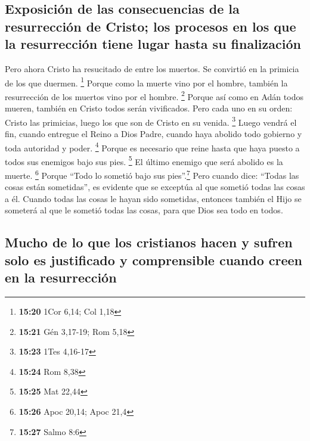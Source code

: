 \begin{paracol}{2}
\hypertarget{exposiciuxf3n-de-las-consecuencias-de-la-resurrecciuxf3n-de-cristo-los-procesos-en-los-que-la-resurrecciuxf3n-tiene-lugar-hasta-su-finalizaciuxf3n}{%
\subsection{Exposición de las consecuencias de la resurrección de
Cristo; los procesos en los que la resurrección tiene lugar hasta su
finalización}\label{exposiciuxf3n-de-las-consecuencias-de-la-resurrecciuxf3n-de-cristo-los-procesos-en-los-que-la-resurrecciuxf3n-tiene-lugar-hasta-su-finalizaciuxf3n}}

 Pero ahora Cristo ha resucitado de entre los muertos. Se
convirtió en la primicia de los que duermen. \footnote{\textbf{15:20}
  1Cor 6,14; Col 1,18}  Porque como la muerte vino por el
hombre, también la resurrección de los muertos vino por el hombre.
\footnote{\textbf{15:21} Gén 3,17-19; Rom 5,18}  Porque
así como en Adán todos mueren, también en Cristo todos serán
vivificados.  Pero cada uno en su orden: Cristo las
primicias, luego los que son de Cristo en su venida. \footnote{\textbf{15:23}
  1Tes 4,16-17}  Luego vendrá el fin, cuando entregue el
Reino a Dios Padre, cuando haya abolido todo gobierno y toda autoridad y
poder. \footnote{\textbf{15:24} Rom 8,38}  Porque es
necesario que reine hasta que haya puesto a todos sus enemigos bajo sus
pies. \footnote{\textbf{15:25} Mat 22,44}  El último
enemigo que será abolido es la muerte. \footnote{\textbf{15:26} Apoc
  20,14; Apoc 21,4}  Porque ``Todo lo sometió bajo sus
pies''.\footnote{\textbf{15:27} Salmo 8:6} Pero cuando dice: ``Todas las
cosas están sometidas'', es evidente que se exceptúa al que sometió
todas las cosas a él.  Cuando todas las cosas le hayan
sido sometidas, entonces también el Hijo se someterá al que le sometió
todas las cosas, para que Dios sea todo en todos.

\hypertarget{mucho-de-lo-que-los-cristianos-hacen-y-sufren-solo-es-justificado-y-comprensible-cuando-creen-en-la-resurrecciuxf3n}{%
\subsection{Mucho de lo que los cristianos hacen y sufren solo es
justificado y comprensible cuando creen en la
resurrección}\label{mucho-de-lo-que-los-cristianos-hacen-y-sufren-solo-es-justificado-y-comprensible-cuando-creen-en-la-resurrecciuxf3n}}


\end{paracol}
